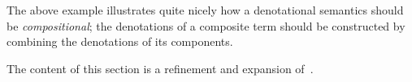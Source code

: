 The above example illustrates quite nicely how a denotational semantics should
be \emph{compositional}; the denotations of a composite term should be
constructed by combining the denotations of its components.

\begin{remark}
    The content of this section is a refinement and expansion
    of~\cite[Section 3]{ghica2023compositional}.
\end{remark}

